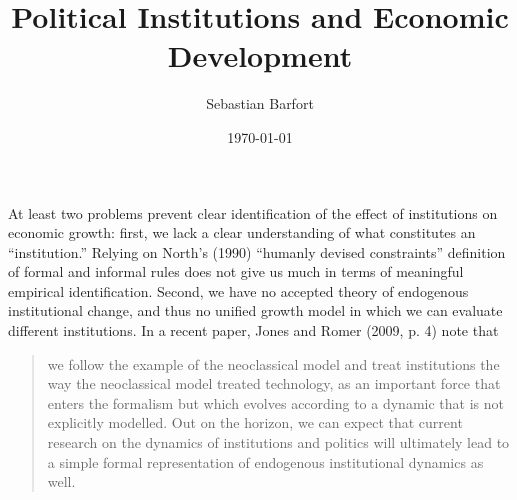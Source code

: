 \documentclass[12pt]{article}%
\begin{document}
\title{Political Institutions and Economic Development }
\author{Sebastian Barfort\medskip\\{\normalsize} \date{\normalsize \today}}
\maketitle

\sloppy




\strut


\thispagestyle{empty}

\pagebreak%

\singlespacing

\section{}
At least two problems prevent clear identification of the effect of institutions on economic growth: first, we lack a clear understanding of what constitutes an ``institution.'' Relying on North's (1990) ``humanly devised constraints'' definition of formal and informal rules does not give us much in terms of meaningful empirical identification. Second, we have no accepted theory of endogenous institutional change, and thus no unified growth model in which we can evaluate different institutions. In a recent paper, Jones and Romer (2009, p. 4) note that 
\begin{quote}
we follow the example of the neoclassical model and treat institutions the way the neoclassical model treated technology, as an important force that enters the formalism but which evolves according to a dynamic that is not explicitly modelled. Out on the horizon, we can expect that current research on the dynamics of institutions and politics will ultimately lead to a simple formal representation of endogenous institutional dynamics as well.
\end{quote}
\end{document}
